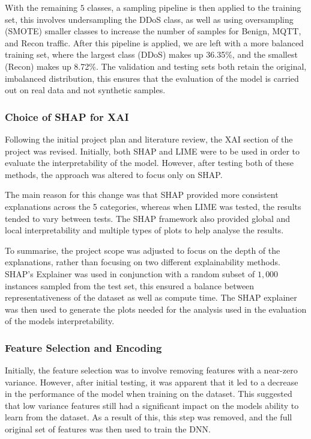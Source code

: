\documentclass[11pt,a4paper]{article}
\begin{document}
With the remaining $5$ classes, a sampling pipeline is then applied to the training set, this involves undersampling the DDoS class, as well as using oversampling (SMOTE) smaller classes to increase the number of samples for Benign, MQTT, and Recon traffic. After this pipeline is applied, we are left with a more balanced training set, where the largest class (DDoS) makes up 36.35\%, and the smallest (Recon) makes up 8.72\%. The validation and testing sets both retain the original, imbalanced distribution, this ensures that the evaluation of the model is carried out on real data and not synthetic samples.

\subsubsection{Choice of SHAP for XAI}
Following the initial project plan and literature review, the XAI section of the project was revised. Initially, both SHAP and LIME were to be used in order to evaluate the interpretability of the model. However, after testing both of these methods, the approach was altered to focus only on SHAP.

The main reason for this change was that SHAP provided more consistent explanations across the 5 categories, whereas when LIME was tested, the results tended to vary between tests. The SHAP framework also provided global and local interpretability and multiple types of plots to help analyse the results.

To summarise, the project scope was adjusted to focus on the depth of the explanations, rather than focusing on two different explainability methods. SHAP’s Explainer was used in conjunction with a random subset of $1,000$ instances sampled from the test set, this ensured a balance between representativeness of the dataset as well as compute time. The SHAP explainer was then used to generate the plots needed for the analysis used in the evaluation of the models interpretability.

\subsubsection{Feature Selection and Encoding}
Initially, the feature selection was to involve removing features with a near-zero variance. However, after initial testing, it was apparent that it led to a decrease in the performance of the model when training on the dataset. This suggested that low variance features still had a significant impact on the models ability to learn from the dataset. As a result of this, this step was removed, and the full original set of features was then used to train the DNN.
\end{document}
